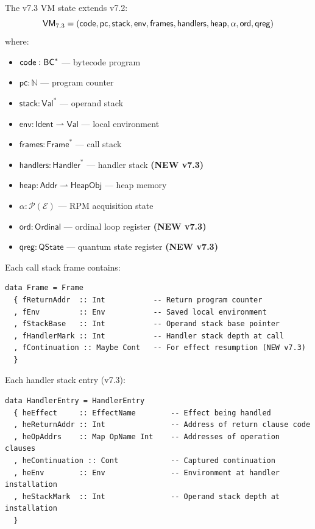 \begin{definition}
\label{def:vm-state-v73}
The v7.3 VM state extends v7.2:
\[
\mathsf{VM}_{7.3} = (\mathsf{code}, \mathsf{pc}, \mathsf{stack}, \mathsf{env}, \mathsf{frames}, \mathsf{handlers}, \mathsf{heap}, \alpha, \mathsf{ord}, \mathsf{qreg})
\]
where:
\begin{itemize}
  \item $\mathsf{code} : \mathsf{BC}^*$ --- bytecode program
  \item $\mathsf{pc} : \mathbb{N}$ --- program counter
  \item $\mathsf{stack} : \mathsf{Val}^*$ --- operand stack
  \item $\mathsf{env} : \mathsf{Ident} \rightharpoonup \mathsf{Val}$ --- local environment
  \item $\mathsf{frames} : \mathsf{Frame}^*$ --- call stack
  \item $\mathsf{handlers} : \mathsf{Handler}^*$ --- handler stack \textbf{(NEW v7.3)}
  \item $\mathsf{heap} : \mathsf{Addr} \rightharpoonup \mathsf{HeapObj}$ --- heap memory
  \item $\alpha : \mathcal{P}(\mathcal{E})$ --- RPM acquisition state
  \item $\mathsf{ord} : \mathsf{Ordinal}$ --- ordinal loop register \textbf{(NEW v7.3)}
  \item $\mathsf{qreg} : \mathsf{QState}$ --- quantum state register \textbf{(NEW v7.3)}
\end{itemize}
\end{definition}

\begin{definition}
\label{def:stack-frame}
Each call stack frame contains:
\begin{verbatim}
data Frame = Frame
  { fReturnAddr  :: Int           -- Return program counter
  , fEnv         :: Env           -- Saved local environment
  , fStackBase   :: Int           -- Operand stack base pointer
  , fHandlerMark :: Int           -- Handler stack depth at call
  , fContinuation :: Maybe Cont   -- For effect resumption (NEW v7.3)
  }
\end{verbatim}
\end{definition}

\begin{definition}
\label{def:handler-entry}
Each handler stack entry (v7.3):
\begin{verbatim}
data HandlerEntry = HandlerEntry
  { heEffect     :: EffectName        -- Effect being handled
  , heReturnAddr :: Int               -- Address of return clause code
  , heOpAddrs    :: Map OpName Int    -- Addresses of operation clauses
  , heContinuation :: Cont            -- Captured continuation
  , heEnv        :: Env               -- Environment at handler installation
  , heStackMark  :: Int               -- Operand stack depth at installation
  }
\end{verbatim}
\end{definition}

